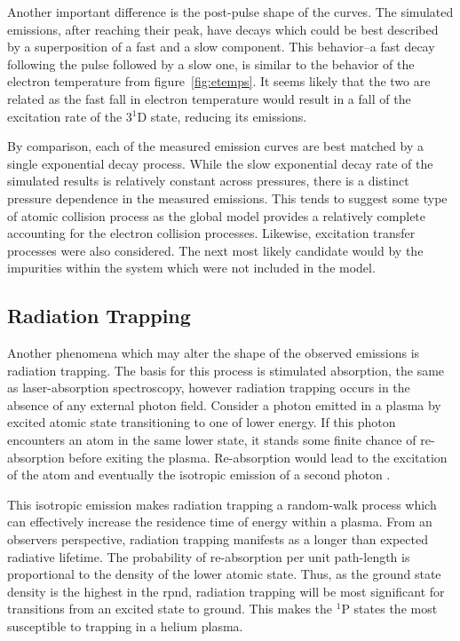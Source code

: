 Another important difference is the post-pulse shape of the curves. The
simulated emissions, after reaching their peak, have decays which could be best
described by a superposition of a fast and a slow component. This behavior--a
fast decay following the pulse followed by a slow one, is similar to the
behavior of the electron temperature from figure~\ref{fig:etemps}. It seems
likely that the two are related as the fast fall in electron temperature would
result in a fall of the excitation rate of the 3$^1$D state, reducing its
emissions.

By comparison, each of the measured emission curves are best matched by a single
exponential decay process. While the slow exponential decay rate of the
simulated results is relatively constant across pressures, there is a distinct
pressure dependence in the measured emissions. This tends to suggest some type
of atomic collision process as the global model provides a relatively complete
accounting for the electron collision processes. Likewise, excitation transfer
processes were also considered. The next most likely candidate would by the
impurities within the system which were not included in the model. 

\subsection{Radiation Trapping}

Another phenomena which may alter the shape of the observed emissions is
radiation trapping. The basis for this process is stimulated absorption, the
same as laser-absorption spectroscopy, however radiation trapping occurs in the
absence of any external photon field. Consider a photon emitted in a plasma by
excited atomic state transitioning to one of lower energy. If this photon
encounters an atom in the same lower state, it stands some finite chance of
re-absorption before exiting the plasma. Re-absorption would lead to the
excitation of the atom and eventually the isotropic emission of a second photon
\cite{Kunze2009}.

This isotropic emission makes radiation trapping a random-walk process which can
effectively increase the residence time of energy within a plasma. From an
observers perspective, radiation trapping manifests as a longer than expected
radiative lifetime. The probability of re-absorption per unit path-length is
proportional to the density of the lower atomic state. Thus, as the ground state
density is the highest in the \acs{rpnd}, radiation trapping will be most
significant for transitions from an excited state to ground. This makes the
$^1$P states the most susceptible to trapping in a helium plasma.

